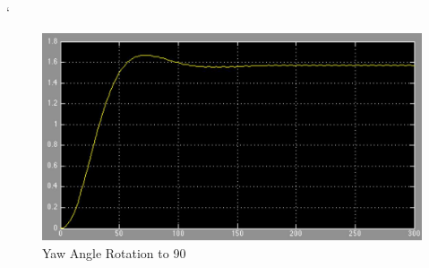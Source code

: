 \vspace{-6mm}
\begin{center}`
    \begin{figure}[H]
        \caption{Yaw Angle Rotation to 90\textdegree} 
        \vspace{-4mm}
        \centering
        \includegraphics[width=\linewidth]{./figures/Yaw_Angle}
    \end{figure}
\end{center}
\vspace{-5mm}
